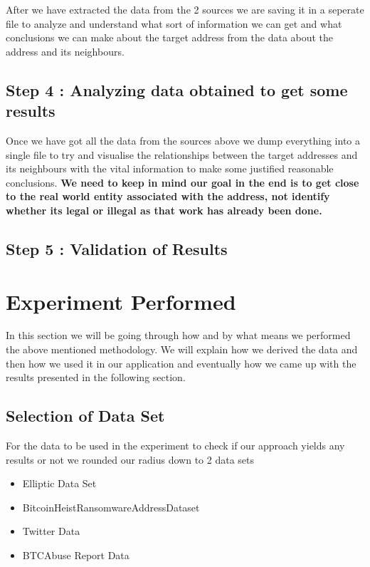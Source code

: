\documentclass{article}
\begin{document}
        After we have extracted the data from the 2 sources we are saving it in a seperate file to analyze and understand what sort of information we can get and what conclusions we can make about the target address from the data about the address and its neighbours.

\pagebreak

    \subsection{Step 4 : Analyzing data obtained to get some results}
    
        Once we have got all the data from the sources above we dump everything into a single file to try and visualise the relationships between the target addresses and its neighbours with the vital information to make some justified reasonable conclusions. \textbf{We need to keep in mind our goal in the end is to get close to the real world entity associated with the address, not identify whether its legal or illegal as that work has already been done.} 
        
\pagebreak

    \subsection{Step 5 : Validation of Results}
    
    
        
\pagebreak

\section{Experiment Performed}      
    In this section we will be going through how and by what means we performed the above mentioned methodology. We will explain how we derived the data and then how we used it in our application and eventually how we came up with the results presented in the following section.
    
    \subsection{Selection of Data Set}
        For the data to be used in the experiment to check if our approach yields any results or not we rounded our radius down to 2 data sets
        \begin{itemize}
            \item Elliptic Data Set\cite{elliptic} \cite{weber2019anti}
            \item BitcoinHeistRansomwareAddressDataset\cite{akcora2019bitcoinheist}
            \item Twitter Data
            \item BTCAbuse Report Data
        \end{itemize}
        
\end{document}
